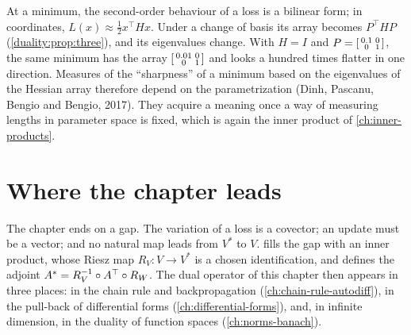 \begin{notechapter}
\begin{pitfall}
At a minimum, the second-order behaviour of a loss is a bilinear form; in
coordinates, $L(x)\approx\frac12x^\top Hx$. Under a change of basis its
array becomes $P^\top HP$ (\cref{duality:prop:three}), and its eigenvalues
change. With $H = I$ and $P = \begin{bsmallmatrix}0.1 & 0\\0 & 1
\end{bsmallmatrix}$, the same minimum has the array
$\begin{bsmallmatrix}0.01 & 0\\0 & 1\end{bsmallmatrix}$ and looks a hundred
times flatter in one direction. Measures of the ``sharpness'' of a minimum
based on the eigenvalues of the Hessian array therefore depend on the
parametrization (Dinh, Pascanu, Bengio and Bengio, 2017). They acquire a
meaning once a way of measuring lengths in parameter space is fixed, which
is again the inner product of \cref{ch:inner-products}.
\end{pitfall}

\section{Where the chapter leads}\label{duality:sec:outlook}

The chapter ends on a gap. The variation of a loss is a covector; an
update must be a vector; and no natural map leads from $V^*$ to $V$.
 fills the gap with an inner product, whose Riesz
map $R_V:V\to V^*$ is a chosen identification, and defines the adjoint
$A^{*} = R_V^{-1}\circ A^{\top}\circ R_W$. The dual operator of this
chapter then appears in three places: in the chain rule and
backpropagation (\cref{ch:chain-rule-autodiff}), in the pull-back of
differential forms (\cref{ch:differential-forms}), and, in infinite
dimension, in the duality of function spaces (\cref{ch:norms-banach}).


\end{notechapter}

